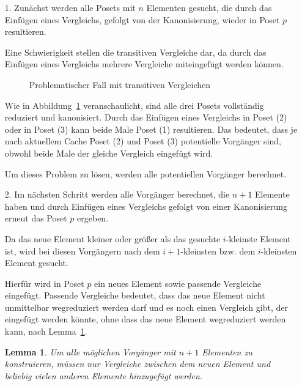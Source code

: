 \documentclass[10pt,journal,compsoc]{IEEEtran}
\newtheorem{lemma}{Lemma}
\begin{document}
\begin{itemize}
  \item[1.]
    Zunächst werden alle Posets mit $n$ Elementen gesucht, die durch das Einfügen eines Vergleichs, gefolgt von der Kanonisierung, wieder in Poset $p$ resultieren.

    Eine Schwierigkeit stellen die transitiven Vergleiche dar, da durch das Einfügen eines Vergleichs mehrere Vergleiche miteingefügt werden können.

    \begin{figure}
      \centering
      
      \caption{Problematischer Fall mit transitiven Vergleichen}
      \label{fig:backward_problematic}
    \end{figure}

    Wie in Abbildung~\ref{fig:backward_problematic} veranschaulicht, sind alle drei Posets vollständig reduziert und kanonisiert.
    Durch das Einfügen eines Vergleichs in Poset (2) oder in Poset (3) kann beide Male Poset (1) resultieren.
    Das bedeutet, dass je nach aktuellem Cache Poset (2) und Poset (3) potentielle Vorgänger sind, obwohl beide Male der gleiche Vergleich eingefügt wird.

    Um dieses Problem zu lösen, werden alle potentiellen Vorgänger berechnet.

  \item[2.]
    Im nächsten Schritt werden alle Vorgänger berechnet, die $n + 1$ Elemente haben und durch Einfügen eines Vergleichs gefolgt von einer Kanonisierung erneut das Poset $p$ ergeben.

    Da das neue Element kleiner oder größer als das gesuchte $i$-kleinste Element ist, wird bei diesen Vorgängern nach dem $i + 1$-kleinsten bzw. dem $i$-kleinsten Element gesucht.

    Hierfür wird in Poset $p$ ein neues Element sowie passende Vergleiche eingefügt.
    Passende Vergleiche bedeutet, dass das neue Element nicht unmittelbar wegreduziert werden darf und es noch einen Vergleich gibt, der eingefügt werden könnte, ohne dass das neue Element wegreduziert werden kann, nach Lemma~\ref{lemma:remove_only_last_element_edge}.

    \begin{lemma} \label{lemma:remove_only_last_element_edge}
      Um alle möglichen Vorgänger mit $n + 1$ Elementen zu konstruieren, müssen nur Vergleiche zwischen dem neuen Element und beliebig vielen anderen Elemente hinzugefügt werden.
    \end{lemma}


\end{itemize}
\end{document}
